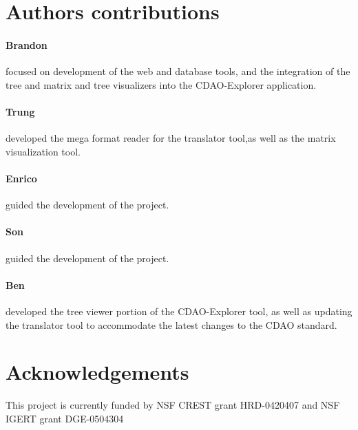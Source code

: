 \documentclass[10pt]{bmc_article}
\newenvironment{bmcformat}{\begin{raggedright}\baselineskip20pt\sloppy\setboolean{publ}{false}}{\end{raggedright}\baselineskip20pt\sloppy}
\begin{document}
\begin{bmcformat}
    
\section*{Authors contributions}
    \paragraph*{Brandon} focused on development of the web and database tools, and the integration of the tree and matrix
      and tree visualizers into the CDAO-Explorer application. 
    \paragraph*{Trung} developed the mega format reader for the translator tool,as well as the matrix visualization tool. 
    \paragraph*{Enrico} guided the development of the project. 
    \paragraph*{Son} guided the development of the project.
    \paragraph*{Ben} developed the tree viewer portion of the CDAO-Explorer tool, as well as updating the translator tool to
       accommodate the latest changes to the CDAO standard. 
    

\section*{Acknowledgements}
  This project is currently funded by NSF CREST grant HRD-0420407 and NSF IGERT grant DGE-0504304


 



\end{bmcformat}
\end{document}
